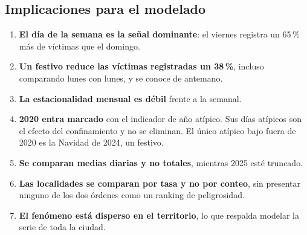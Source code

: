 \subsection{Implicaciones para el modelado}\label{sec:eda-implicaciones}

\begin{enumerate}
  \item \textbf{El día de la semana es la señal dominante}: el viernes registra un 65\,\% más de víctimas que el domingo.
  \item \textbf{Un festivo reduce las víctimas registradas un 38\,\%}, incluso comparando lunes con lunes, y se conoce de antemano.
  \item \textbf{La estacionalidad mensual es débil} frente a la semanal.
  \item \textbf{2020 entra marcado} con el indicador de año atípico. Sus días atípicos son el efecto del confinamiento y no se eliminan. El único atípico bajo fuera de 2020 es la Navidad de 2024, un festivo.
  \item \textbf{Se comparan medias diarias y no totales}, mientras 2025 esté truncado.
  \item \textbf{Las localidades se comparan por tasa y no por conteo}, sin presentar ninguno de los dos órdenes como un ranking de peligrosidad.
  \item \textbf{El fenómeno está disperso en el territorio}, lo que respalda modelar la serie de toda la ciudad.
\end{enumerate}
